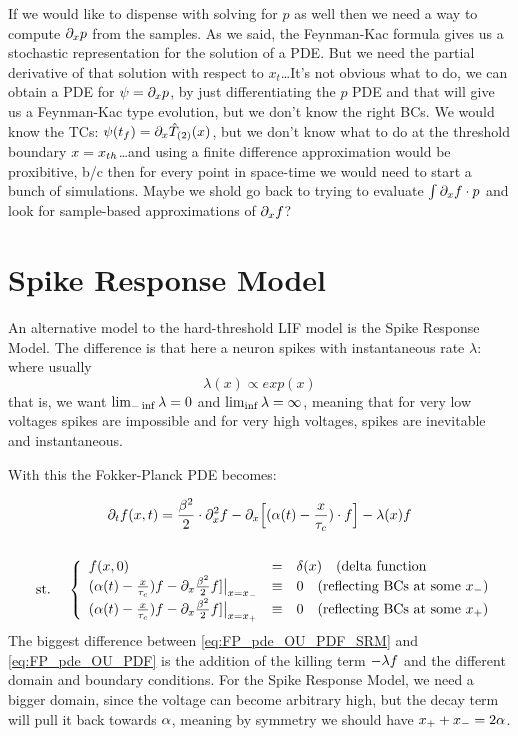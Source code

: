 \documentclass{article}
\begin{document}
If we would like to dispense with solving for $p$ as well then we need a way to
compute ${\partial}_x p$ from the samples. As we said, the Feynman-Kac formula gives us
a stochastic representation for the solution of a PDE. But we need the
partial derivative of that solution with respect to $x_t$\ldots It's not obvious
what to do, we can obtain a PDE for $\psi = {\partial}_x p$, by just differentiating
the $p$ PDE and that will give us a Feynman-Kac type evolution, but we don't
know the right BCs. We would know the TCs: $\psi({ t_f }) = {\partial}_x { \hat{T}_{(2)} }(x)$, but we
don't know what to do at the threshold boundary $x={ x_{th} }$\ldots and using a
finite difference approximation would be proxibitive, b/c then for every point
in space-time we would need to start a bunch of simulations. Maybe we shold go
back to trying to evaluate $\int {\partial}_x f \cdot p$ and look for sample-based
approximations of ${\partial}_x f$?


\section{Spike Response Model}
An alternative model to the hard-threshold LIF model is the Spike Response
Model. The difference is that here a neuron spikes with instantaneous rate
$\lambda$:
where usually
$$
\lambda(x) \propto exp(x)  
$$
that is, we want $\lim_{-\inf} {\lambda} = 0$ and $\lim_{\inf} {\lambda} = \infty$, meaning
that for very low voltages spikes are impossible and for very  high voltages,
spikes are inevitable and instantaneous. 

With this the Fokker-Planck PDE becomes:

\begin{equation}
\begin{gathered}
{\partial}_t f(x,t) =
				\frac{{\beta}^2 }{2}\cdot {\partial}^2_x f -  
				{\partial}_x \Big[ ({\alpha}(t)- \frac{x}{{ \tau_{c} }})  \cdot f \Big]
				-{\lambda}(x) f 
\\
\\
\begin{array}{lll}
	&\textrm{st.\ }& 
	\left\{ \begin{array}{lcl}
	 f(x,0) &=& \delta(x) \quad (\textrm{delta function}
	\\
	({\alpha}(t)- \tfrac x {{ \tau_{c} }})f - {\partial}_x \tfrac {{\beta}^2}2 f] \big|_{x={ x_{-} }} &\equiv& 0
	\quad (\textrm{reflecting BCs at some } { x_{-} } )
	\\
	({\alpha}(t)- \tfrac x {{ \tau_{c} }})f - {\partial}_x \tfrac {{\beta}^2}2 f] \big|_{x={ x_{+} }} &\equiv& 0
	\quad (\textrm{reflecting BCs at some } { x_{+} } )
\end{array} \right. 
\end{array}
\label{eq:FP_pde_OU_PDF_SRM}
\end{gathered}
\end{equation}
The biggest difference between \cref{eq:FP_pde_OU_PDF_SRM} and
\cref{eq:FP_pde_OU_PDF} is the addition of the killing term $-{\lambda} f$ and the
different domain and boundary conditions.  For the Spike Response Model, we need
a bigger domain, since the voltage can become arbitrary high, but the decay term
will pull it back towards ${\alpha}$, meaning by symmetry we should have ${ x_{+} } +
{ x_{-} } = 2\alpha$.
\end{document}
